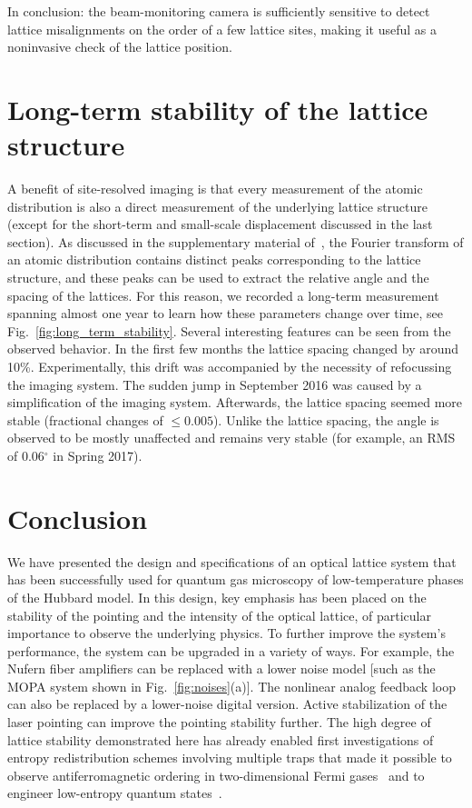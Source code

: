 \documentclass[twocolumn,aps,pra,showpacs,preprintnumbers,bibnotes]{revtex4-1}
\begin{document}
In conclusion: the beam-monitoring camera is sufficiently sensitive to detect lattice misalignments on the order of a few lattice sites, making it useful as a noninvasive check of the lattice position.


\section{Long-term stability of the lattice structure}
A benefit of site-resolved imaging is that every measurement of the atomic distribution is also a direct measurement of the underlying lattice structure (except for the short-term and small-scale displacement discussed in the last section).
As discussed in the supplementary material of~\cite{Parsons2016, Greif2016}, the Fourier transform of an atomic distribution contains distinct peaks corresponding to the lattice structure, and these peaks can be used to extract the relative angle and the spacing of the lattices.
For this reason, we recorded a long-term measurement spanning almost one year to learn how these parameters change over time, see Fig.~\ref{fig:long_term_stability}.
Several interesting features can be seen from the observed behavior. In the first few months the lattice spacing changed by around 10\%. Experimentally, this drift was accompanied by the necessity of refocussing the imaging system. The sudden jump in September 2016 was caused by a simplification of the imaging system. Afterwards, the lattice spacing seemed more stable (fractional changes of $\leq 0.005$). Unlike the lattice spacing, the angle is observed to be mostly unaffected and remains very stable (for example, an RMS of 0.06$^\circ$ in Spring 2017).

\section{Conclusion}
We have presented the design and specifications of an optical lattice system that has been successfully used for quantum gas microscopy of low-temperature phases of the Hubbard model.
In this design, key emphasis has been placed on the stability of the pointing and the intensity of the optical lattice, of particular importance to observe the underlying physics.
To further improve the system's performance, the system can be upgraded in a variety of ways. For example, the Nufern fiber amplifiers can be replaced with a lower noise model [such as the MOPA system shown in Fig.~\ref{fig:noises}(a)]. The nonlinear analog feedback loop can also be replaced by a lower-noise digital version.
Active stabilization of the laser pointing can improve the pointing stability further.
The high degree of lattice stability demonstrated here has already enabled first investigations of entropy redistribution schemes involving multiple traps that made it possible to observe antiferromagnetic ordering in two-dimensional Fermi gases~\cite{Mazurenko2017} and to engineer low-entropy quantum states~\cite{Chiu2018}.


\end{document}
